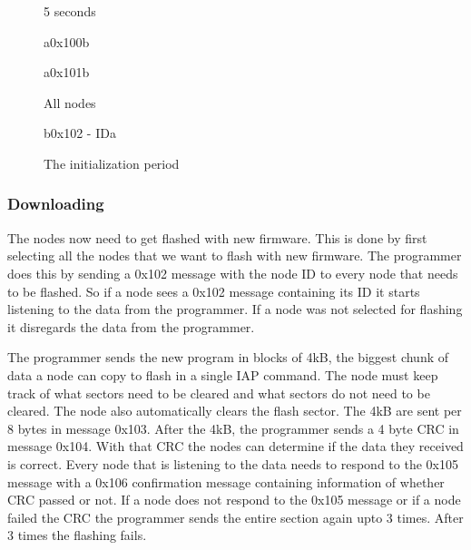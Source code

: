 \documentclass[twocolumn]{article}
\begin{document}
			\begin{figure}[t]
				\centering
				\begin{sequencediagram}
				
					\begin{sdloop}{5 seconds}
						\begin{call}{a}{0x100}{b}{}
						\end{call}
					\end{sdloop}
				
					\begin{call}{a}{0x101}{b}{}
						\begin{sdloop}{All nodes}
							\begin{call}{b}{0x102 - ID}{a}{}
							\end{call}
						\end{sdloop}
					\end{call}
				\end{sequencediagram}
				\caption{The initialization period}
			\end{figure}
		
		\subsubsection*{Downloading}
			The nodes now need to get flashed with new firmware.
			This is done by first selecting all the nodes that we want to flash with new firmware.
			The programmer does this by sending a 0x102 message with the node ID to every node that needs to be flashed.
			So if a node sees a 0x102 message containing its ID it starts listening to the data from the programmer.
			If a node was not selected for flashing it disregards the data from the programmer.
			
			The programmer sends the new program in blocks of 4kB,
			the biggest chunk of data a node can copy to flash in a single IAP command.
			The node must keep track of what sectors need to be cleared and what sectors do not need to be cleared.
			The node also automatically clears the flash sector.
			The 4kB are sent per 8 bytes in message 0x103.
			After the 4kB, the programmer sends a 4 byte CRC in message 0x104.
			With that CRC the nodes can determine if the data they received is correct.
			Every node that is listening to the data needs to respond to the 0x105 message with a 0x106 confirmation message containing information of whether CRC passed or not.
			If a node does not respond to the 0x105 message or if a node failed the CRC the programmer sends the entire section again upto 3 times.
			After 3 times the flashing fails.
			
\end{document}
